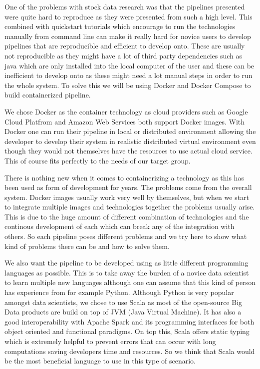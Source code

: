 One of the problems with stock data research was that the pipelines presented were quite hard to reproduce as they were presented from such a high level.
This combined with quickstart tutorials which encourage to run the technologies manually from command line can make it really hard for novice users to develop pipelines that are reproducible and efficient to develop onto.
These are usually not reproducible as they might have a lot of third party dependencies such as java which are only installed into the local computer of the user and these can be inefficient to develop onto as these might need a lot manual steps in order to run the whole system.
To solve this we will be using Docker and Docker Compose to build containerized pipeline.

We chose Docker as the container technology as cloud providers such as Google Cloud Platfrom and Amazon Web Services both support Docker images. \cite{awsdocker} \cite{gcpdocker}
With Docker one can run their pipeline in local or distributed environment allowing the developer to develop their system in realistic distributed virtual environment even though they would not themselves have the resources to use actual cloud service.
This of course fits perfectly to the needs of our target group.

There is nothing new when it comes to containerizing a technology as this has been used as form of development for years.
The problems come from the overall system.
Docker images usually work very well by themselves, but when we start to integrate multiple images and technologies together the problems usually arise.
This is due to the huge amount of different combination of technologies and the continous development of each which can break any of the integration with others.
So each pipeline poses different problems and we try here to show what kind of problems there can be and how to solve them.

We also want the pipeline to be developed using as little different programming languages as possible.
This is to take away the burden of a novice data scientist to learn multiple new languages although one can assume that this kind of person has experience from for example Python.
Although Python is very popular amongst data scientists, we chose to use Scala as most of the open-source Big Data products are build on top of JVM (Java Virtual Machine). 
It has also a good interoperability with Apache Spark and its programming interfaces for both object oriented and functional paradigms.
On top this, Scala offers static typing which is extremely helpful to prevent errors that can occur with long computations saving developers time and resources. \cite{scalabook}
So we think that Scala would be the most beneficial language to use in this type of scenario.

